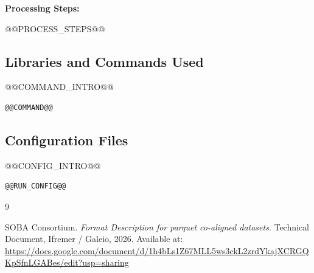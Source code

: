 \documentclass[11pt,a4paper]{article}
\begin{document}
\textbf{Processing Steps:}
\begin{enumerate}
@@PROCESS_STEPS@@
\end{enumerate}

\subsection{Libraries and Commands Used}
@@COMMAND_INTRO@@
\begin{lstlisting}[caption={Command used to generate this dataset.}, label={lst:code}]
@@COMMAND@@
\end{lstlisting}

\subsection{Configuration Files}
@@CONFIG_INTRO@@
\begin{lstlisting}[caption={Settings recorded for this dataset.}, label={lst:config}]
@@RUN_CONFIG@@
\end{lstlisting}

\newpage
\newpage
{}

\begin{thebibliography}{9}

SOBA Consortium.
\textit{Format Description for parquet co-aligned datasets}.
Technical Document, Ifremer / Galeio, 2026.
Available at: \url{https://docs.google.com/document/d/1h4bLs1Z67MLL5ws3ckL2zrdYkajXCRGQKpSfnLGABes/edit?usp=sharing}

\end{thebibliography}
\end{document}
